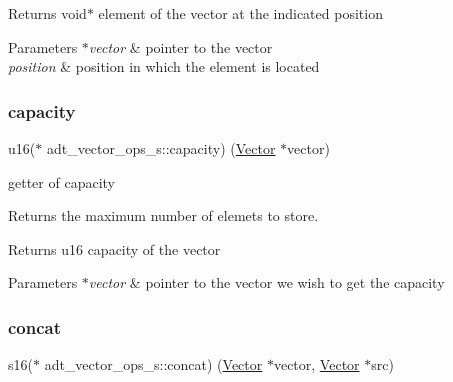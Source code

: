 \begin{DoxyReturn}{Returns}
void$\ast$ element of the vector at the indicated position 
\end{DoxyReturn}

\begin{DoxyParams}{Parameters}
{\em $\ast$vector} & pointer to the vector \\
\hline
{\em position} & position in which the element is located \\
\hline
\end{DoxyParams}
\mbox{\label{structadt__vector__ops__s_aec1da152ce6f8d3b96ad1246378e6e64}} 
\subsubsection{\texorpdfstring{capacity}{capacity}}
{\footnotesize\ttfamily u16($\ast$ adt\+\_\+vector\+\_\+ops\+\_\+s\+::capacity) (\hyperlink{structadt__vector__s}{Vector} $\ast$vector)}



getter of capacity 

Returns the maximum number of elemets to store.

\begin{DoxyReturn}{Returns}
u16 capacity of the vector 
\end{DoxyReturn}

\begin{DoxyParams}{Parameters}
{\em $\ast$vector} & pointer to the vector we wish to get the capacity \\
\hline
\end{DoxyParams}
\mbox{\label{structadt__vector__ops__s_af7b29ff02c5f4d8db4b32e8443e96361}} 
\subsubsection{\texorpdfstring{concat}{concat}}
{\footnotesize\ttfamily s16($\ast$ adt\+\_\+vector\+\_\+ops\+\_\+s\+::concat) (\hyperlink{structadt__vector__s}{Vector} $\ast$vector, \hyperlink{structadt__vector__s}{Vector} $\ast$src)}



